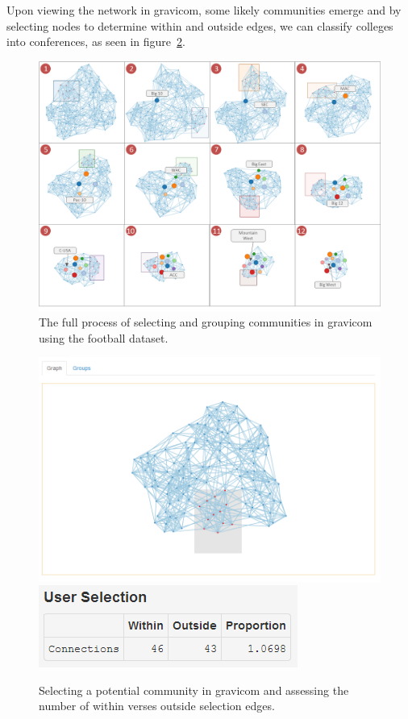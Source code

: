 \documentclass{article}\usepackage[]{graphicx}\usepackage[]{color}
\begin{document}
Upon viewing the network in gravicom, some likely communities emerge and by selecting nodes to determine within and outside edges, we can classify colleges into conferences, as seen in figure~\ref{fig:football_2}.

\begin{figure}[H]
\centering
\includegraphics[width=\textwidth]{images/football_progression.png}
\caption{\label{fig:football_progression}The full process of selecting and grouping communities in gravicom using the football dataset.}
\end{figure}



\begin{figure}[H]
\centering
\includegraphics[width=\textwidth]{images/football_2.png}
\includegraphics[]{images/football_3.png}
\caption{\label{fig:football_2} Selecting a potential community in gravicom and assessing the number of within verses outside selection edges.}
\end{figure}
\end{document}
